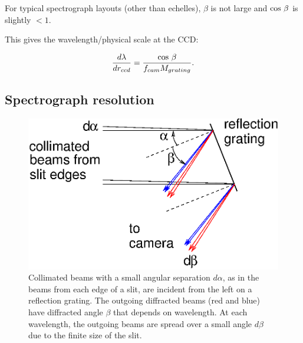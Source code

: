 \documentclass[12pt]{article}
\begin{document}
For typical spectrograph layouts (other than echelles), $\beta$
is not large and ${\rm cos}\ \beta$ is slightly $<1$.


This gives the wavelength/physical scale at the CCD:

$$  \frac{d\lambda}{dr_{ccd}} = \frac{{\rm cos}~\beta}{f_{cam}  M_{grating}}. $$


\subsection{Spectrograph resolution}

\begin{figure}[ht]
\centerline{
\includegraphics[width=4.5truein]{gratingslit.eps}
}
\caption{Collimated beams with a small angular separation $d\alpha$, 
as in the beams from each edge of a slit, are incident from the left 
on a reflection grating.
The outgoing diffracted beams (red and blue) have diffracted angle
$\beta$ that depends on wavelength.  At each wavelength, the
outgoing beams are spread over a small angle $d\beta$ due to
the finite size of the slit.
}
\label{fig-gratingslit}
\end{figure}
\end{document}
